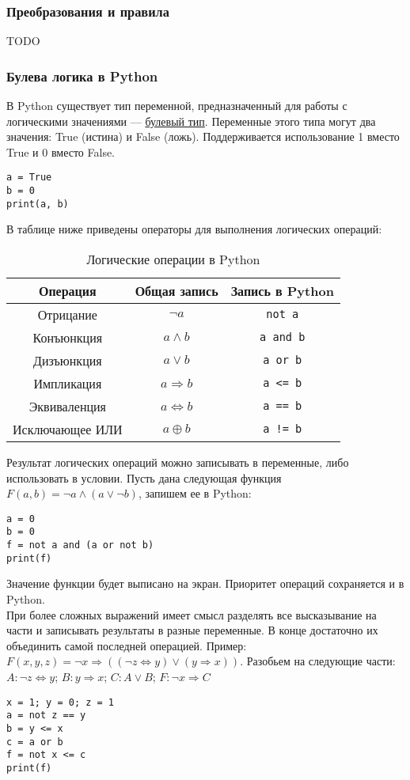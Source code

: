 \documentclass[12pt]{article}
\theoremstyle{problem_style}
\begin{document}
\subsubsection{Преобразования и правила}
TODO
\subsubsection{Булева логика в Python}
В Python существует тип переменной, предназначенный для работы с логическими значениями — \href{https://docs.python.org/3/library/stdtypes.html#boolean-type-bool}{булевый тип}. Переменные этого типа могут два значения: True (истина) и False (ложь). Поддерживается использование 1 вместо True и 0 вместо False.
\begin{verbatim}
a = True
b = 0
print(a, b)
\end{verbatim}
В таблице ниже приведены операторы для выполнения логических операций:
\begin{table}[h]
    \centering
    \begin{tabular}{c|c|c}
         Операция & Общая запись & Запись в Python \\ \hline
         Отрицание & \(\neg a\) & \texttt{not a} \\
         Конъюнкция & \(a \land b\) & \texttt{a and b} \\
         Дизъюнкция & \(a \lor b\) & \texttt{a or b} \\
         Импликация & \(a \Rightarrow b\) & \texttt{a <= b} \\
         Эквиваленция & \(a \Leftrightarrow b\) & \texttt{a == b} \\
         Исключающее ИЛИ & \(a \oplus b\) & \texttt{a != b} \\
         \hline
    \end{tabular}
    \caption{Логические операции в Python}
    \label{tab:lops_python}
\end{table}
Результат логических операций можно записывать в переменные, либо использовать в условии.
Пусть дана следующая функция \(F(a, b) = \neg a \land (a \lor \neg b)\), запишем ее в Python:
\begin{verbatim}
a = 0
b = 0
f = not a and (a or not b)
print(f)
\end{verbatim}
Значение функции будет выписано на экран. Приоритет операций сохраняется и в Python. \\
При более сложных выражений имеет смысл разделять все высказывание на части и записывать результаты в разные переменные. В конце достаточно их объединить самой последней операцией. Пример: \(F(x, y, z) = \neg x \Rightarrow ((\neg z \Leftrightarrow y) \lor (y \Rightarrow x))\). Разобьем на следующие части: \(A: \neg z \Leftrightarrow y\); \(B: y \Rightarrow x\); \(C: A \lor B\); \(F: \neg x \Rightarrow C\)
\begin{verbatim}
x = 1; y = 0; z = 1
a = not z == y
b = y <= x
c = a or b
f = not x <= c
print(f)
\end{verbatim}
\end{document}
